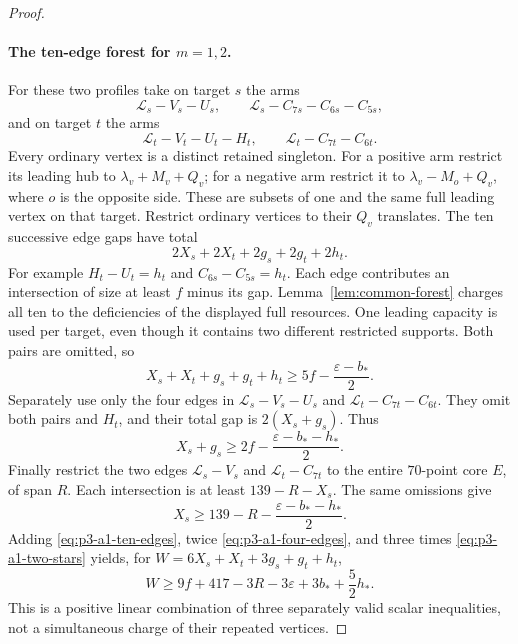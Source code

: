 \documentclass[11pt,letterpaper]{article}
\theoremstyle{definition}\newtheorem{definition}[theorem]{Definition}
\begin{document}
\begin{proof}
\paragraph{The ten-edge forest for $m=1,2$.}
For these two profiles take on target $s$ the arms
\[
 \mathcal L_s-V_s-U_s,\qquad
 \mathcal L_s-C_{7s}-C_{6s}-C_{5s},
\]
and on target $t$ the arms
\[
 \mathcal L_t-V_t-U_t-H_t,\qquad
 \mathcal L_t-C_{7t}-C_{6t}.
\]
Every ordinary vertex is a distinct retained singleton. For a positive
arm restrict its leading hub to $\lambda_v+M_v+Q_v$; for a negative
arm restrict it to $\lambda_v-M_o+Q_v$, where $o$ is the opposite
side. These are subsets of one and the same full leading vertex on
that target. Restrict ordinary vertices to their $Q_v$ translates.
The ten successive edge gaps have total
\[
 2X_s+2X_t+2g_s+2g_t+2h_t.
\]
For example $H_t-U_t=h_t$ and $C_{6s}-C_{5s}=h_t$.
Each edge contributes an intersection of size at least $f$ minus its
gap. Lemma~\ref{lem:common-forest} charges all ten to the deficiencies
of the displayed full resources. One leading capacity is used per
target, even though it contains two different restricted supports.
Both pairs are omitted, so
\begin{equation}\label{eq:p3-a1-ten-edges}
 X_s+X_t+g_s+g_t+h_t
 \ge5f-\frac{\varepsilon-b_*}{2}.
\end{equation}
Separately use only the four edges in
$\mathcal L_s-V_s-U_s$ and $\mathcal L_t-C_{7t}-C_{6t}$.
They omit both pairs and $H_t$, and their total gap is $2(X_s+g_s)$.
Thus
\begin{equation}\label{eq:p3-a1-four-edges}
 X_s+g_s\ge2f-\frac{\varepsilon-b_*-h_*}{2}.
\end{equation}
Finally restrict the two edges $\mathcal L_s-V_s$ and
$\mathcal L_t-C_{7t}$ to the entire $70$-point core $E$, of span $R$.
Each intersection is at least $139-R-X_s$. The same omissions give
\begin{equation}\label{eq:p3-a1-two-stars}
 X_s\ge139-R-\frac{\varepsilon-b_*-h_*}{2}.
\end{equation}
Adding \eqref{eq:p3-a1-ten-edges}, twice
\eqref{eq:p3-a1-four-edges}, and three times
\eqref{eq:p3-a1-two-stars} yields, for
$W=6X_s+X_t+3g_s+g_t+h_t$,
\begin{equation}\label{eq:p3-a1-W}
 W\ge9f+417-3R-3\varepsilon
             +3b_*+\frac52h_*.
\end{equation}
This is a positive linear combination of three separately valid scalar
inequalities, not a simultaneous charge of their repeated vertices.


\end{proof}
\end{document}
